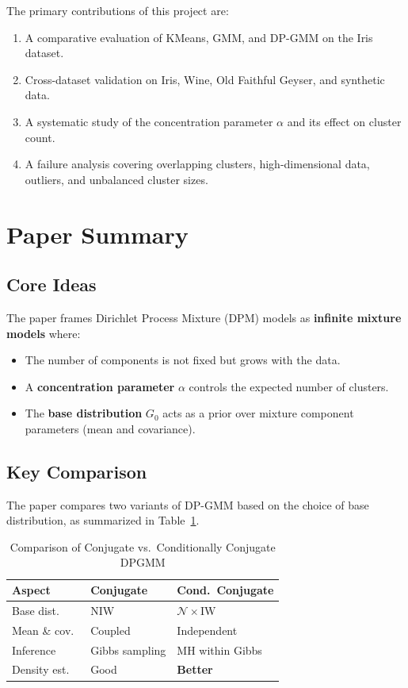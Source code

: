 \documentclass[conference]{IEEEtran}
\begin{document}
The primary contributions of this project are:
\begin{enumerate}
    \item A comparative evaluation of KMeans, GMM, and DP-GMM on the Iris dataset.
    \item Cross-dataset validation on Iris, Wine, Old Faithful Geyser, and synthetic data.
    \item A systematic study of the concentration parameter $\alpha$ and its effect on cluster count.
    \item A failure analysis covering overlapping clusters, high-dimensional data, outliers, and unbalanced cluster sizes.
\end{enumerate}

\section{Paper Summary}

\subsection{Core Ideas}

The paper frames Dirichlet Process Mixture (DPM) models as \textbf{infinite mixture models} where:
\begin{itemize}
    \item The number of components is not fixed but grows with the data.
    \item A \textbf{concentration parameter} $\alpha$ controls the expected number of clusters.
    \item The \textbf{base distribution} $G_0$ acts as a prior over mixture component parameters (mean and covariance).
\end{itemize}

\subsection{Key Comparison}

The paper compares two variants of DP-GMM based on the choice of base distribution, as summarized in Table~\ref{tab:dpgmm_comparison}.

\begin{table}[h]
\centering
\caption{Comparison of Conjugate vs.\ Conditionally Conjugate DPGMM}
\label{tab:dpgmm_comparison}
\begin{tabular}{@{}lll@{}}
\toprule
\textbf{Aspect} & \textbf{Conjugate} & \textbf{Cond.\ Conjugate} \\
\midrule
Base dist.\ & NIW & $\mathcal{N} \times \text{IW}$ \\
Mean \& cov.\ & Coupled & Independent \\
Inference & Gibbs sampling & MH within Gibbs \\
Density est.\ & Good & \textbf{Better} \\
\bottomrule
\end{tabular}
\end{table}
\end{document}
